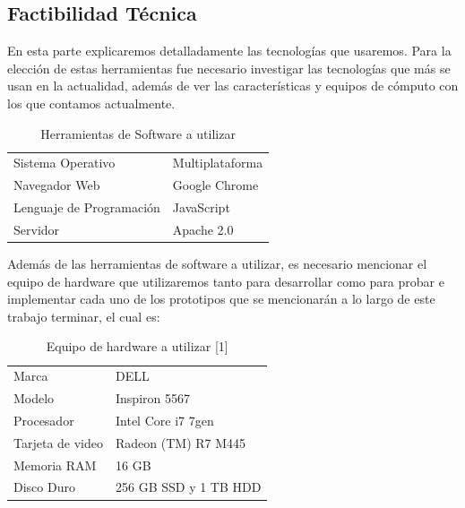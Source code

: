 \documentclass[12pt, a4paper, titlepage]{report}
\begin{document}
    	    \subsection{Factibilidad Técnica}
    	    En esta parte explicaremos detalladamente las tecnologías que usaremos. Para la elección de estas herramientas  fue necesario investigar las tecnologías que más se usan en la actualidad, además de ver las características y equipos de c\'omputo con los que contamos actualmente.
    	        \begin{table}[H]
    				\begin{tabular}{ |p{3.5cm}||p{9.5cm}|}
    					\hline
    					\rowcolor{guindapoli}
    					\multicolumn{2}{|c|}{\textbf{\textcolor{white}{Factibilidad T\'ecnica}}}\\
    					\hline
    					\cellcolor{azulclaro}Sistema Operativo & 
    					Multiplataforma \\ 
    					\hline
    					\cellcolor{azulclaro}Navegador Web &
    					Google Chrome\\
    					\hline
    					\cellcolor{azulclaro}Lenguaje de Programaci\'on &
    					JavaScript\\
    					\hline
    					\cellcolor{azulclaro}Servidor &
    					Apache 2.0\\
    					\hline
    					
    				\end{tabular}
    				\caption[Herramientas de Software]{Herramientas de Software a utilizar}
    				\end{table}
    				Además de las herramientas de software a utilizar, es necesario mencionar el equipo de hardware que utilizaremos tanto para desarrollar como para probar e implementar cada uno de los prototipos que se mencionarán a lo largo de este trabajo terminar, el cual es:
    				\begin{table}[H]
        				\begin{tabular}{ |p{3.5cm}||p{9.5cm}|}
        					\hline
        					\rowcolor{guindapoli}
        					\multicolumn{2}{|c|}{\textbf{\textcolor{white}{Equipo de hardware [1]}}}\\
        					\hline
        					\rowcolor{azulfuerte}Marca & DELL\\
        					\hline
        					\cellcolor{azulclaro}Modelo & Inspiron 5567\\ 
        					\hline
        					\cellcolor{azulclaro}Procesador &
        					Intel Core i7 7gen\\
        					\hline
        					\cellcolor{azulclaro}Tarjeta de video & 
        					Radeon (TM) R7 M445\\
        					\hline
        					\cellcolor{azulclaro}Memoria RAM &
        					16 GB\\
        					\hline
        					\cellcolor{azulclaro}Disco Duro &
        					256 GB SSD y 1 TB HDD\\
        					\hline
        				\end{tabular}
    				\caption[Equipo de Hardware 1]{Equipo de hardware a utilizar [1]}
    				\end{table}
\end{document}
